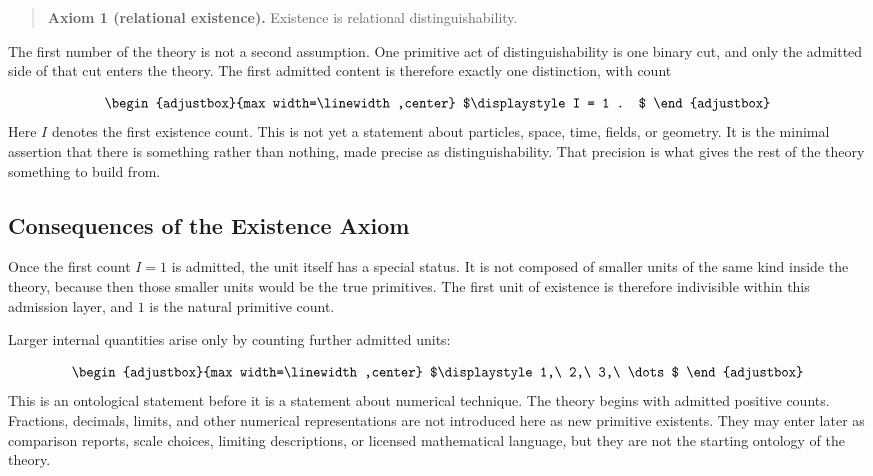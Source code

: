 \begin{quote}
\textbf{Axiom 1 (relational existence).} Existence is relational distinguishability.
\end{quote}
The first number of the theory is not a second assumption. One primitive act of distinguishability is one binary cut, and only the admitted side of that cut enters the theory. The first admitted content is therefore exactly one distinction, with count

\begin{equation*}
\begin{adjustbox}{max width=\linewidth,center}
$\displaystyle
I = 1 .
$
\end{adjustbox}
\end{equation*}
Here \(I\) denotes the first existence count. This is not yet a statement about particles, space, time, fields, or geometry. It is the minimal assertion that there is something rather than nothing, made precise as distinguishability. That precision is what gives the rest of the theory something to build from.

\subsection{Consequences of the Existence Axiom}
Once the first count \(I=1\) is admitted, the unit itself has a special status. It is not composed of smaller units of the same kind inside the theory, because then those smaller units would be the true primitives. The first unit of existence is therefore indivisible within this admission layer, and \(1\) is the natural primitive count.

Larger internal quantities arise only by counting further admitted units:

\begin{equation*}
\begin{adjustbox}{max width=\linewidth,center}
$\displaystyle
1,\ 2,\ 3,\ \dots
$
\end{adjustbox}
\end{equation*}
This is an ontological statement before it is a statement about numerical technique. The theory begins with admitted positive counts. Fractions, decimals, limits, and other numerical representations are not introduced here as new primitive existents. They may enter later as comparison reports, scale choices, limiting descriptions, or licensed mathematical language, but they are not the starting ontology of the theory.

